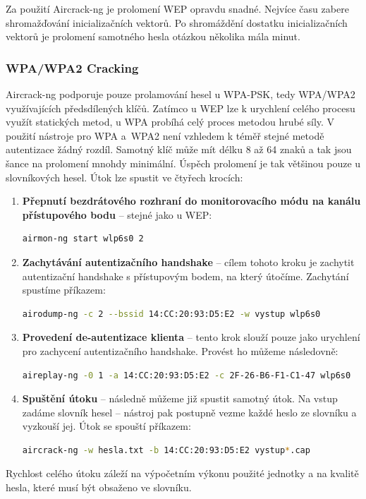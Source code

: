 Za použití Aircrack-ng je prolomení WEP opravdu snadné. Nejvíce času zabere shromažďování inicializačních vektorů. Po shromáždění dostatku inicializačních vektorů je prolomení samotného hesla otázkou několika mála minut.

\subsubsection*{WPA/WPA2 Cracking}
Aircrack-ng podporuje pouze prolamování hesel u WPA-PSK, tedy WPA/WPA2 využívajících předsdílených klíčů. Zatímco u WEP lze k urychlení celého procesu využít statických metod, u WPA probíhá celý proces metodou hrubé síly. V použití nástroje pro WPA a~WPA2 není vzhledem k téměř stejné metodě autentizace žádný rozdíl. Samotný klíč může mít délku 8 až 64 znaků a tak jsou šance na prolomení mnohdy minimální. Úspěch prolomení je tak většinou pouze u slovníkových hesel. Útok lze spustit ve čtyřech krocích:
\begin{enumerate}
  \item{\textbf{Přepnutí bezdrátového rozhraní do monitorovacího módu na kanálu přístupového bodu} -- stejné jako u WEP:
\begin{lstlisting}[language=bash]
airmon-ng start wlp6s0 2
\end{lstlisting}
  }
  \item{\textbf{Zachytávání autentizačního handshake} -- cílem tohoto kroku je zachytit autentizační handshake s přístupovým bodem, na který útočíme. Zachytání spustíme příkazem:
\begin{lstlisting}[language=bash]
airodump-ng -c 2 --bssid 14:CC:20:93:D5:E2 -w vystup wlp6s0
\end{lstlisting}
  }
  \item{\textbf{Provedení de-autentizace klienta} -- tento krok slouží pouze jako urychlení pro zachycení autentizačního handshake. Provést ho můžeme následovně:
\begin{lstlisting}[language=bash]
aireplay-ng -0 1 -a 14:CC:20:93:D5:E2 -c 2F-26-B6-F1-C1-47 wlp6s0
\end{lstlisting}
  }
  \item{\textbf{Spuštění útoku} -- následně můžeme již spustit samotný útok. Na vstup zadáme slovník hesel -- nástroj pak postupně vezme každé heslo ze slovníku a vyzkouší jej. Útok se spouští příkazem:
\begin{lstlisting}[language=bash]
aircrack-ng -w hesla.txt -b 14:CC:20:93:D5:E2 vystup*.cap
\end{lstlisting}
  }
\end{enumerate}
Rychlost celého útoku záleží na výpočetním výkonu použité jednotky a na kvalitě hesla, které musí být obsaženo ve slovníku.

